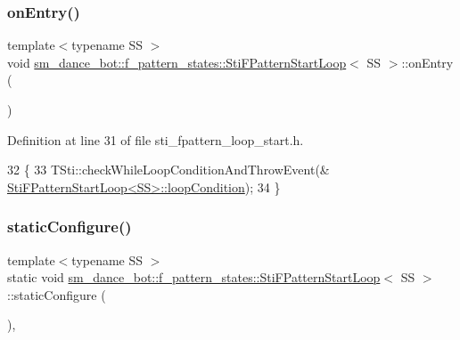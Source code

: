 \subsubsection{\texorpdfstring{on\+Entry()}{onEntry()}}
{\footnotesize\ttfamily template$<$typename SS $>$ \\
void \hyperlink{structsm__dance__bot_1_1f__pattern__states_1_1StiFPatternStartLoop}{sm\+\_\+dance\+\_\+bot\+::f\+\_\+pattern\+\_\+states\+::\+Sti\+F\+Pattern\+Start\+Loop}$<$ SS $>$\+::on\+Entry (\begin{DoxyParamCaption}{ }\end{DoxyParamCaption})\hspace{0.3cm}{\ttfamily [inline]}}



Definition at line 31 of file sti\+\_\+fpattern\+\_\+loop\+\_\+start.\+h.


\begin{DoxyCode}
32   \{
33     TSti::checkWhileLoopConditionAndThrowEvent(&
      \hyperlink{structsm__dance__bot_1_1f__pattern__states_1_1StiFPatternStartLoop_a96b8f0ea52222677cf4888165bb7df1b}{StiFPatternStartLoop<SS>::loopCondition});
34   \}
\end{DoxyCode}
\mbox{\label{structsm__dance__bot_1_1f__pattern__states_1_1StiFPatternStartLoop_a0afdecaf306a1ada485ae632cc77a753}} 
\subsubsection{\texorpdfstring{static\+Configure()}{staticConfigure()}}
{\footnotesize\ttfamily template$<$typename SS $>$ \\
static void \hyperlink{structsm__dance__bot_1_1f__pattern__states_1_1StiFPatternStartLoop}{sm\+\_\+dance\+\_\+bot\+::f\+\_\+pattern\+\_\+states\+::\+Sti\+F\+Pattern\+Start\+Loop}$<$ SS $>$\+::static\+Configure (\begin{DoxyParamCaption}{ }\end{DoxyParamCaption})\hspace{0.3cm}{\ttfamily [inline]}, {\ttfamily [static]}}



